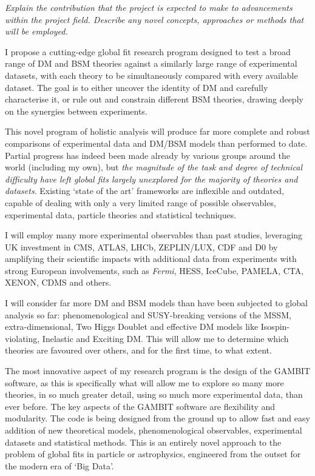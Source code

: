\documentclass[a4paper,11pt]{article}
\newenvironment{xcomment}{\em}{}
\begin{document}
\begin{xcomment}
Explain the contribution that the project is expected to make to
advancements within the project field. Describe any novel concepts,
approaches or methods that will be employed.
\end{xcomment}

I propose a cutting-edge global fit research program designed to test a broad range of DM and BSM theories against a
similarly large range of experimental datasets, with each theory to be simultaneously compared with every available
dataset. The goal is to either uncover the identity of DM and carefully characterise it, or rule out and constrain different
BSM theories, drawing deeply on the synergies between experiments. 

This novel program of holistic analysis will produce far more complete and robust comparisons of experimental data and DM/BSM models than performed to date.  Partial progress has indeed been made already by various groups around the world (including my own), but \textit{the magnitude of the task and degree of technical difficulty have left global fits largely unexplored for the majority of theories and datasets}.  Existing `state of the art' frameworks \cite{Fittino12,Mastercode12b,Strege13} are inflexible and outdated, capable of dealing with only a very limited range of possible observables, experimental data, particle theories and statistical techniques.

I will employ many more experimental observables than past studies, leveraging UK investment in CMS, ATLAS, LHCb, ZEPLIN/LUX, CDF and D0 by amplifying their scientific impacts with additional data from experiments with strong European involvements, such as \textit{Fermi}, HESS, IceCube, PAMELA, CTA, XENON, CDMS and others. 

I will consider far more DM and BSM models than have been subjected to global analysis so far: phenomenological and SUSY-breaking versions of the MSSM, extra-dimensional, Two Higgs Doublet and effective DM models like Isospin-violating, Inelastic and Exciting DM. This will allow me to determine which theories are favoured over others, and for the first time, to what extent.

The most innovative aspect of my research program is the design of the GAMBIT software, as this is specifically what will allow me to explore so many more theories, in so much greater detail, using so much more experimental data, than ever before.  The key aspects of the GAMBIT software are flexibility and modularity.  The code is being designed from the ground up to allow fast and easy addition of new theoretical models, phenomenological observables, experimental datasets and statistical methods.  This is an entirely novel approach to the problem of global fits in particle or astrophysics, engineered from the outset for the modern era of `Big Data'.  
\end{document}
